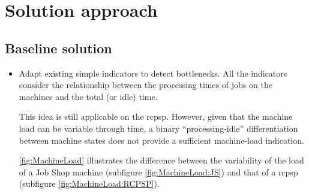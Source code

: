 \chapter{Solution approach} \label{chap:solution-apporach}

\section{Baseline solution}

\begin{itemize}
    \item Adapt existing simple indicators to detect bottlenecks.
        All the indicators consider the relationship between the processing times of jobs on the machines
        and the total (or idle) time.
        
        This idea is still applicable on the \ac{rcpsp}. However, given that the machine load can be variable
        through time, a binary \enquote{processing-idle} differentiation between machine states does not
        provide a sufficient machine-load indication.

        \cref{fig:MachineLoad} illustrates the difference between the variability of the load
        of a Job Shop machine (subfigure \ref{fig:MachineLoad:JS}) and that of a \ac{rcpsp}
        (subfigure \ref{fig:MachineLoad:RCPSP}).

    \begin{figure}[t]
      \centering

      \\


\end{figure}
\end{itemize}
